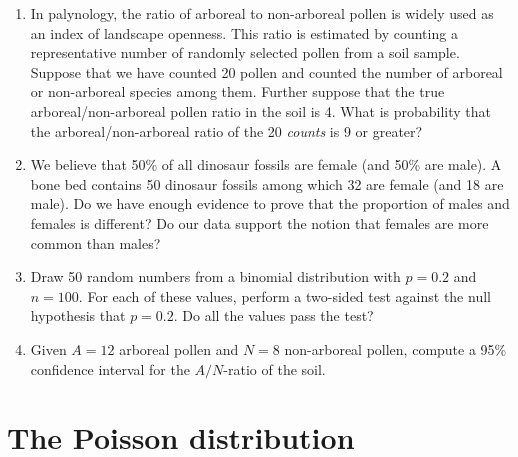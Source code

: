 \begin{enumerate}
  
\item In palynology, the ratio of arboreal to non-arboreal pollen is
  widely used as an index of landscape openness. This ratio is
  estimated by counting a representative number of randomly selected
  pollen from a soil sample.  Suppose that we have counted 20 pollen
  and counted the number of arboreal or non-arboreal species among
  them. Further suppose that the true arboreal/non-arboreal pollen
  ratio in the soil is 4. What is probability that the
  arboreal/non-arboreal ratio of the 20 \emph{counts} is 9 or greater?

\item We believe that 50\% of all dinosaur fossils are female (and
  50\% are male). A bone bed contains 50 dinosaur fossils among which
  32 are female (and 18 are male). Do we have enough evidence to prove
  that the proportion of males and females is different?  Do our data
  support the notion that females are more common than males?

\item Draw 50 random numbers from a binomial distribution with $p=0.2$
  and $n=100$. For each of these values, perform a two-sided test
  against the null hypothesis that $p=0.2$. Do all the values pass the
  test?

\item Given $A=12$ arboreal pollen and $N=8$ non-arboreal pollen,
  compute a 95\% confidence interval for the $A/N$-ratio of the soil.


\end{enumerate}

\section{The Poisson distribution}
\label{sec:ex-poisson}

